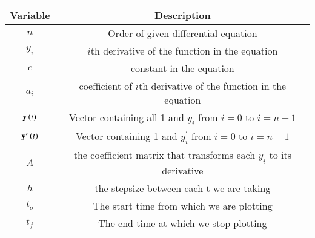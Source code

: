 \begin{tabular}[12pt]{ |c| c|}
    \hline
    \textbf{Variable} & \textbf{Description}\\ 
    \hline
    $n$ & Order of given differential equation\\
    \hline
    $y_i$ & $i$th derivative of the function in the equation\\
    \hline
    $c$ & constant in the equation\\
    \hline
    $a_i$&coefficient of $i$th derivative of the function in the equation\\
    \hline
    $\mathbf{y}\left(t\right)$& Vector containing all 1 and $y_i$ from $i=0$ to $i=n-1$\\
    \hline
    $\mathbf{y}^{\prime}\left(t\right)$ & Vector containing 1 and $y^{\prime}_i$ from $i=0$ to $i=n-1$\\
    \hline
    $A$& the coefficient matrix that transforms each $y_i$ to its derivative\\
    \hline
    $h$&the stepsize between each t we are taking\\
    \hline
    $t_o$& The start time from which we are plotting\\
    \hline
    $t_f$& The end time at which we stop plotting\\
    \hline
    \end{tabular}
